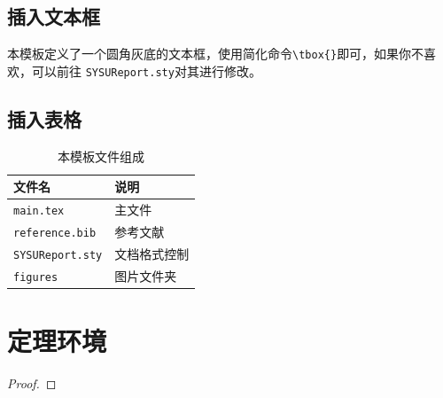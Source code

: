 \documentclass{CQMUReport}  %
\begin{document}
\subsection{插入文本框}
本模板定义了一个圆角灰底的文本框，使用简化命令\verb|\tbox{}|即可，如果你不喜欢，可以前往 \texttt{SYSUReport.sty}对其进行修改。


\subsection{插入表格}


\begin{table}[!htbp]
    \centering
    \begin{tabular}{l|l}
        \hline
        文件名                  & 说明         \\
        \hline
        \texttt{main.tex}       & 主文件       \\
        \texttt{reference.bib}  & 参考文献     \\
        \texttt{SYSUReport.sty} & 文档格式控制 \\
        \texttt{figures}        & 图片文件夹   \\
        \hline
    \end{tabular}
    \caption{本模板文件组成}
    \label{doc}
\end{table}

\section{定理环境}
\begin{Theorem}
\end{Theorem}

\begin{Lemma}
\end{Lemma}

\begin{Corollary}
\end{Corollary}

\begin{Proposition}
\end{Proposition}

\begin{Definition}
\end{Definition}

\begin{Example}
\end{Example}

\begin{proof}
\end{proof}
\end{document}
